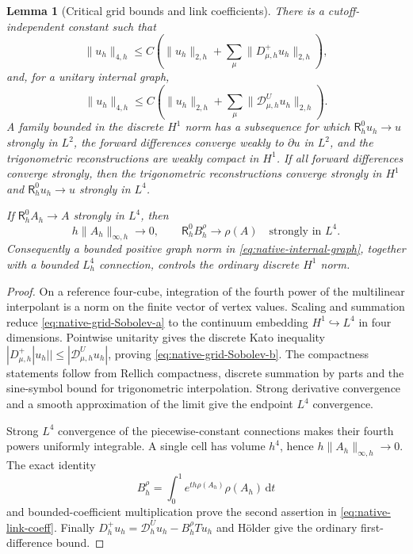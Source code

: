 \documentclass[11pt]{article}
\numberwithin{equation}{section}
\newtheorem{lemma}[lemma]{Lemma}
\theoremstyle{definition}
\theoremstyle{remark}
\newcommand{\dd}{\mathrm d}
\newcommand{\norm}[1]{\lVert#1\rVert}
\begin{document}
\begin{lemma}[Critical grid bounds and link coefficients]
\label{lem:native-critical-grid}
There is a cutoff-independent constant such that
\begin{equation}
 \norm{u_h}_{4,h}\le C\left(\norm{u_h}_{2,h}
           +\sum_\mu\norm{D^+_{\mu,h}u_h}_{2,h}\right),
 \label{eq:native-grid-Sobolev-a}
\end{equation}
and, for a unitary internal graph,
\begin{equation}
 \norm{u_h}_{4,h}\le C\left(\norm{u_h}_{2,h}
           +\sum_\mu\norm{\mathcal D^U_{\mu,h}u_h}_{2,h}\right).
 \label{eq:native-grid-Sobolev-b}
\end{equation}
A family bounded in the discrete $H^1$ norm has a subsequence for which
$\mathsf R_h^0u_h\to u$ strongly in $L^2$, the forward differences converge
weakly to $\partial u$ in $L^2$, and the trigonometric reconstructions are
weakly compact in $H^1$.  If all forward differences converge strongly,
then the trigonometric reconstructions converge strongly in $H^1$ and
$\mathsf R_h^0u_h\to u$ strongly in $L^4$.

If $\mathsf R_h^0A_h\to A$ strongly in $L^4$, then
\begin{equation}
 h\norm{A_h}_{\infty,h}\to0,
 \qquad
 \mathsf R_h^0B^\rho_h\to\rho(A)
       \quad\text{strongly in }L^4.
 \label{eq:native-link-coeff}
\end{equation}
Consequently a bounded positive graph norm in
\eqref{eq:native-internal-graph}, together with a bounded $L_h^4$ connection,
controls the ordinary discrete $H^1$ norm.
\end{lemma}
\begin{proof}
On a reference four-cube, integration of the fourth power of the multilinear
interpolant is a norm on the finite vector of vertex values.  Scaling and
summation reduce \eqref{eq:native-grid-Sobolev-a} to the continuum embedding
$H^1\hookrightarrow L^4$ in four dimensions.  Pointwise unitarity gives the
discrete Kato inequality
$|D^+_{\mu,h}|u_h||\le|\mathcal D^U_{\mu,h}u_h|$, proving
\eqref{eq:native-grid-Sobolev-b}.  The compactness statements follow from
Rellich compactness, discrete summation by parts and the sine-symbol bound
for trigonometric interpolation.  Strong derivative convergence and a smooth
approximation of the limit give the endpoint $L^4$ convergence.

Strong $L^4$ convergence of the piecewise-constant connections makes their
fourth powers uniformly integrable.  A single cell has volume $h^4$, hence
$h\norm{A_h}_{\infty,h}\to0$.  The exact identity
\[
 B^\rho_h=\int_0^1e^{th\rho(A_h)}\rho(A_h)\,\dd t
\]
and bounded-coefficient multiplication prove the second assertion in
\eqref{eq:native-link-coeff}.  Finally
$D_h^+u_h=\mathcal D_h^Uu_h-B_h^\rho T u_h$ and H\"older give the ordinary
first-difference bound.
\end{proof}
\end{document}
